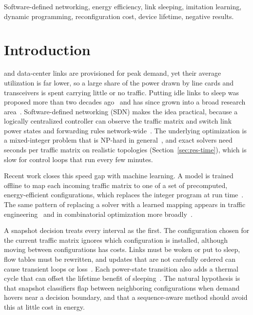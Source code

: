 \documentclass[journal]{IEEEtran}
\begin{document}
\begin{IEEEkeywords}
Software-defined networking, energy efficiency, link sleeping, imitation learning, dynamic programming, reconfiguration cost, device lifetime, negative results.
\end{IEEEkeywords}

\section{Introduction}

 and data-center links are provisioned for peak demand, yet their average utilization is far lower, so a large share of the power drawn by line cards and transceivers is spent carrying little or no traffic. Putting idle links to sleep was proposed more than two decades ago~\cite{gupta2003greening} and has since grown into a broad research area~\cite{bianzino2012survey,bolla2011energy}. Software-defined networking (SDN) makes the idea practical, because a logically centralized controller can observe the traffic matrix and switch link power states and forwarding rules network-wide~\cite{mckeown2008openflow,kreutz2015sdn}. The underlying optimization is a mixed-integer problem that is NP-hard in general~\cite{chiaraviglio2012minimizing}, and exact solvers need seconds per traffic matrix on realistic topologies (Section~\ref{sec:res-time}), which is slow for control loops that run every few minutes.

Recent work closes this speed gap with machine learning. A model is trained offline to map each incoming traffic matrix to one of a set of precomputed, energy-efficient configurations, which replaces the integer program at run time~\cite{gomezdelahiz2025noms,gomezdelahiz2026tgcn}. The same pattern of replacing a solver with a learned mapping appears in traffic engineering~\cite{xu2023teal,perry2023dote,abuzaid2021ncflow,almasan2022enero} and in combinatorial optimization more broadly~\cite{bengio2021mlco}.

A snapshot decision treats every interval as the first. The configuration chosen for the current traffic matrix ignores which configuration is installed, although moving between configurations has costs. Links must be woken or put to sleep, flow tables must be rewritten, and updates that are not carefully ordered can cause transient loops or loss~\cite{reitblatt2012abstractions,jin2014dionysus}. Each power-state transition also adds a thermal cycle that can offset the lifetime benefit of sleeping~\cite{chiaraviglio2015lifetime,chiaraviglio2014impact}. The natural hypothesis is that snapshot classifiers flap between neighboring configurations when demand hovers near a decision boundary, and that a sequence-aware method should avoid this at little cost in energy.
\end{document}

